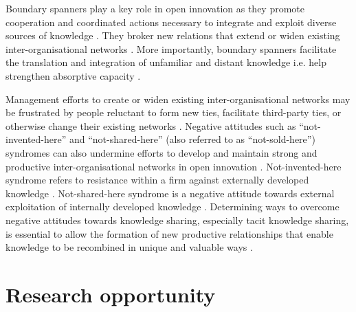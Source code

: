 Boundary spanners play a key role in open innovation as they promote cooperation and coordinated actions necessary to integrate and exploit diverse sources of knowledge \citep{fleming2007brokerage}. They broker new relations that extend or widen existing inter-organisational networks \citep{granovetter1973strength}. More importantly, boundary spanners facilitate the translation and integration of unfamiliar and distant knowledge i.e. help strengthen absorptive capacity \citep{tushman1981boundary,allen1984managing,fleming2007brokerage,meyer2010rise,tortoriello2010activating}. \medskip 

Management efforts to create or widen existing inter-organisational networks may be frustrated by people reluctant to form new ties, facilitate third-party ties, or otherwise change their existing networks \citep{davis2010agency}. Negative attitudes such as \enquote{not-invented-here} and \enquote{not-shared-here} (also referred to as \enquote{not-sold-here}) syndromes can also undermine efforts to develop and maintain strong and productive inter-organisational networks in open innovation \citep{lichtenthaler2006attitudes,lichtenthaler2011your,de2014neither,podmetina2015skills,chesbrough2017future}. Not-invented-here syndrome refers to resistance within a firm against externally developed knowledge \citep{katz1982investigating,hussinger2011search,antons2015opening}. Not-shared-here syndrome is a negative attitude towards external exploitation of internally developed knowledge \citep{chesbrough2003open,lichtenthaler2006attitudes,de2014neither}. Determining ways to overcome negative attitudes towards knowledge sharing, especially tacit knowledge sharing, is essential to allow the formation of new productive relationships that enable knowledge to be recombined in unique and valuable ways \citep{uzzi1997social,nahapiet1998social,obstfeld2005social,lane2006reification,davis2010agency,meyer2010rise}. \medskip


\section{Research opportunity}


